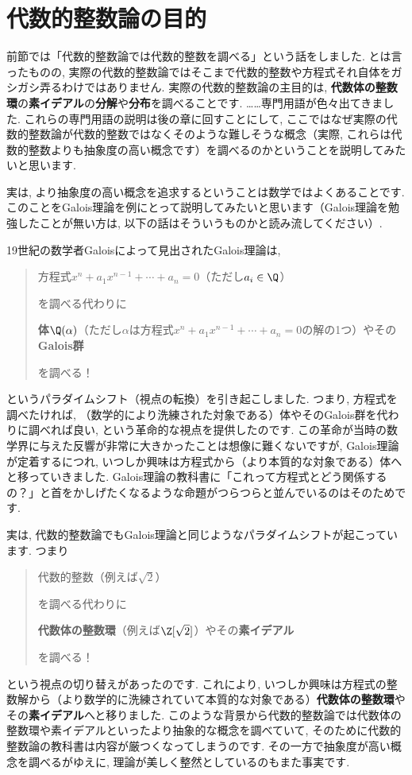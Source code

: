 \documentclass[11pt,b5paper,oneside,titlepage,lualatex]{ltjsreport}
\begin{document}
\section{代数的整数論の目的} \label{sec:代数的整数論の目的}


前節では「代数的整数論では代数的整数を調べる」という話をしました. 
とは言ったものの, 実際の代数的整数論ではそこまで代数的整数や方程式それ自体をガシガシ弄るわけではありません. 
実際の代数的整数論の主目的は, \textbf{代数体の整数環}の\textbf{素イデアル}の\textbf{分解}や\textbf{分布}を調べることです. 
……専門用語が色々出てきました. 
これらの専門用語の説明は後の章に回すことにして, ここではなぜ実際の代数的整数論が代数的整数ではなくそのような難しそうな概念（実際, これらは代数的整数よりも抽象度の高い概念です）を調べるのかということを説明してみたいと思います. 

実は, より抽象度の高い概念を追求するということは数学ではよくあることです. 
このことをGalois理論を例にとって説明してみたいと思います（Galois理論を勉強したことが無い方は, 以下の話はそういうものかと読み流してください）. 

19世紀の数学者Galoisによって見出されたGalois理論は, 
\begin{quote}
	\centering
	方程式$ x^n + a_1 x^{n-1} + \cdots + a_n = 0 $（ただし$ a_i \in \Q $）
	
	を調べる代わりに
	
	\textbf{体}$ \Q(\alpha) $（ただし$ \alpha $は方程式$ x^n + a_1 x^{n-1} + \cdots + a_n = 0 $の解の1つ）やその\textbf{Galois群}
	
	を調べる！
\end{quote}
というパラダイムシフト（視点の転換）を引き起こしました. 
つまり, 方程式を調べたければ, （数学的により洗練された対象である）体やそのGalois群を代わりに調べれば良い, という革命的な視点を提供したのです. 
この革命が当時の数学界に与えた反響が非常に大きかったことは想像に難くないですが, Galois理論が定着するにつれ, いつしか興味は方程式から（より本質的な対象である）体へと移っていきました. 
Galois理論の教科書に「これって方程式とどう関係するの？」と首をかしげたくなるような命題がつらつらと並んでいるのはそのためです. 

実は, 代数的整数論でもGalois理論と同じようなパラダイムシフトが起こっています. つまり
\begin{quote}
	\centering
	代数的整数（例えば$ \sqrt{2} $）
	
	を調べる代わりに
	
	\textbf{代数体の整数環}（例えば$ \Z[\sqrt{2}] $）やその\textbf{素イデアル}
	
	を調べる！
\end{quote}
という視点の切り替えがあったのです. 
これにより, いつしか興味は方程式の整数解から（より数学的に洗練されていて本質的な対象である）\textbf{代数体の整数環}やその\textbf{素イデアル}へと移りました. 
このような背景から代数的整数論では代数体の整数環や素イデアルといったより抽象的な概念を調べていて, そのために代数的整数論の教科書は内容が厳つくなってしまうのです. 
その一方で抽象度が高い概念を調べるがゆえに, 理論が美しく整然としているのもまた事実です. 
\end{document}
